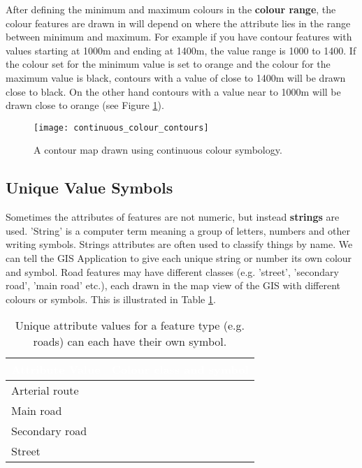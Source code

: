 After defining the minimum and maximum colours in the \textbf{colour range}, the
colour features are drawn in will depend on where the attribute lies in the
range between minimum and maximum. For example if you have contour features
with values starting at 1000m and ending at 1400m, the value range is 1000 to
1400. If the colour set for the minimum value is set to orange and the colour
for  the maximum value is black, contours with a value of close to 1400m will
be drawn close to black. On the other hand contours with a value near to
1000m will be drawn close to orange (see Figure \ref{fig:contourmap}).


\begin{figure}[ht]
   \begin{center}
   \caption{A contour map drawn using continuous colour symbology.}
\label{fig:contourmap}\smallskip
   \texttt{[image: continuous\_colour\_contours]}
\end{center}
\end{figure}

\subsection{Unique Value Symbols}

Sometimes the attributes of features are not numeric, but instead
\textbf{strings} are
used. 'String' is a computer term meaning a group of letters, numbers and
other writing symbols. Strings attributes are often used to classify things
by name. We can tell the GIS Application to give each unique string or number
its own colour and symbol. Road features may have different classes (e.g.
'street', 'secondary road', 'main road' etc.), each drawn in the map view of
the GIS with different colours or symbols. This is illustrated in Table
\ref{tab:unicolor}.

\begin{table}[ht]
\centering
\caption{Unique attribute values for a feature type (e.g. roads) can each
have their own symbol.}\medskip
 \label{tab:unicolor}
 \begin{tabular}{|p{8cm}|p{8cm}|}
 \hline
 \rowcolor{black}
 \textcolor{white}{\textbf{Attribute Value}} &
 \textcolor{white}{\textbf{Colour class and symbol}} \\
 \hline Arterial route &  \\
 \hline Main road &  \\
 \hline Secondary road &  \\
 \hline Street &  \\
\hline
\end{tabular}
\end{table}

